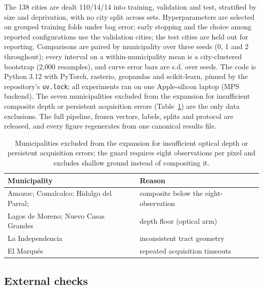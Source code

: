 \documentclass[11pt]{article}
\begin{document}
The 138 cities are dealt 110/14/14 into training, validation and test, stratified by
size and deprivation, with no city split across sets. Hyperparameters are selected on
grouped training folds under bag error; early stopping and the choice among reported
configurations use the validation cities; the test cities are held out for reporting.
Comparisons are paired by municipality over three seeds (0, 1 and 2 throughout); every
interval on a within-municipality mean is a city-clustered bootstrap (2{,}000
resamples), and curve error bars are s.d. over seeds. The code is Python 3.12 with
PyTorch, rasterio, geopandas and scikit-learn, pinned by the repository's
\texttt{uv.lock}; all experiments ran on one Apple-silicon laptop (MPS backend). The
seven municipalities excluded from the expansion for insufficient composite depth or
persistent acquisition errors (Table~\ref{tab:exclusions}) are the only data exclusions. The
full pipeline, frozen vectors, labels, splits and protocol are released, and every
figure regenerates from one canonical results file.

\begin{table}[htbp]
\centering
\caption{Municipalities excluded from the expansion for insufficient optical depth or
persistent acquisition errors; the guard requires eight observations per pixel and
excludes shallow ground instead of compositing it.}
\begin{tabular}{ll}
\toprule
Municipality & Reason\\
\midrule
Amozoc; Comalcalco; Hidalgo del Parral; & composite below the eight-observation\\
Lagos de Moreno; Nuevo Casas Grandes & depth floor (optical arm)\\
La Independencia & inconsistent tract geometry\\
El Marqu\'es & repeated acquisition timeouts\\
\bottomrule
\end{tabular}
\label{tab:exclusions}
\end{table}

\subsection{External checks}
\end{document}
